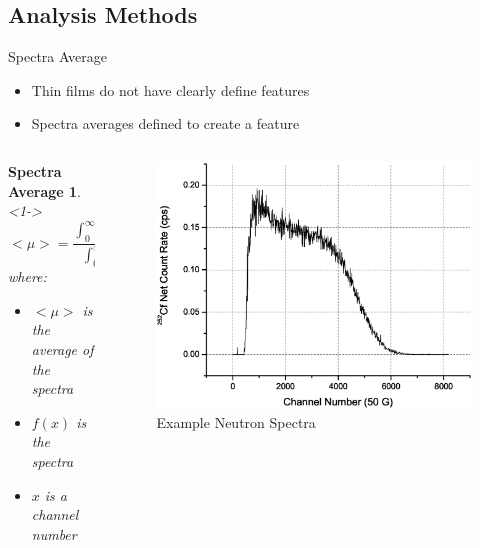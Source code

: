 \subsection{Analysis Methods}
\begin{frame}{Spectra Average}
	\begin{itemize}
		\item Thin films do not have clearly define features
		\item Spectra averages defined to create a feature
	\end{itemize}
\begin{columns}[onlytextwidth]
\begin{column}{0.45\textwidth}
	\newtheorem{thm4}{Spectra Average}
	\begin{thm4}<1->
		$$<\mu> = \frac{\int_{0}^{\infty}x\cdot f(x)dx}{\int_{0}^{\infty}f(x)dx} $$
		where:
		\begin{itemize}
			\tiny
			\item $<\mu>$ is the average of the spectra
			\item $f(x)$ is the spectra
			\item $x$ is a channel number
		\end{itemize}
	\end{thm4}
\end{column}
\begin{column}{0.45\textwidth}
	\begin{figure}
		\centering
		\includegraphics[width=\textwidth]{images/StrechedPEN-Neutron.eps}
		\caption{Example Neutron Spectra}
	\end{figure}
\end{column}
\end{columns}
\end{frame}
